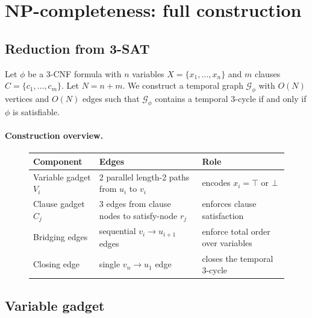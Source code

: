 \documentclass[journal,onecolumn]{IEEEtran}
\newcommand{\G}{\mathcal{G}}
\begin{document}
\appendices

\section{NP-completeness: full construction}
\label{sec:appx-np}

\subsection{Reduction from 3-SAT}

Let $\phi$ be a 3-CNF formula with $n$ variables $X = \{x_1, \ldots, x_n\}$
and $m$ clauses $C = \{c_1, \ldots, c_m\}$. Let $N = n + m$. We construct a
temporal graph $\G_\phi$ with $O(N)$ vertices and $O(N)$ edges such that
$\G_\phi$ contains a temporal $3$-cycle if and only if $\phi$ is satisfiable.

\paragraph{Construction overview.}

\begin{figure}[h]
\centering
\small
\begin{tabular}{lll}
\toprule
\textbf{Component} & \textbf{Edges} & \textbf{Role} \\
\midrule
Variable gadget $V_i$ & 2 parallel length-2 paths from $u_i$ to $v_i$ & encodes $x_i = \top$ or $\bot$ \\
Clause gadget $C_j$ & 3 edges from clause nodes to satisfy-node $r_j$ & enforces clause satisfaction \\
Bridging edges & sequential $v_i \to u_{i+1}$ edges & enforce total order over variables \\
Closing edge & single $v_n \to u_1$ edge & closes the temporal 3-cycle \\
\bottomrule
\end{tabular}
\end{figure}

\subsection{Variable gadget}
\end{document}
